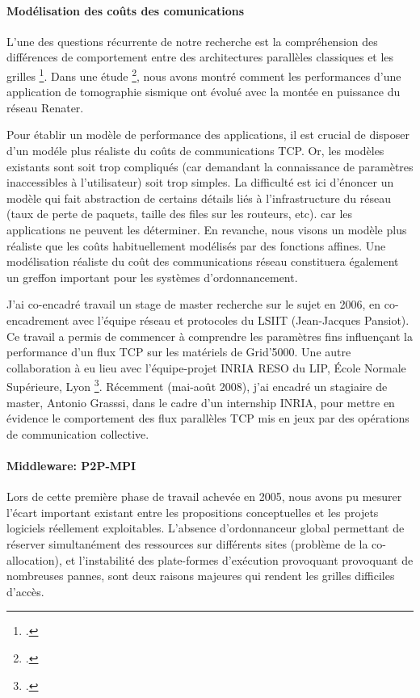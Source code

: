 \documentclass[11pt]{article}
\newcommand{\pmpi}{\mbox{\textsc{P2P-MPI}}}
\begin{document}
\paragraph{Modélisation des coûts des comunications}
\label{sc:modele-cout}
L'une des questions récurrente de notre recherche est la compréhension 
des différences de comportement entre des architectures parallèles classiques et les grilles 
\footcite{icps-2002-20,icps-2004-107}. Dans une étude \footcite{icps-2005-146}, nous avons montré comment les 
performances d'une application de tomographie sismique ont évolué avec la montée en puissance du réseau Renater.

Pour établir un modèle de performance des applications, il est crucial de disposer
d'un modéle plus réaliste du coûts de communications TCP. Or, les modèles existants
sont soit trop compliqués (car demandant la connaissance de paramètres inaccessibles
à l'utilisateur) soit trop simples.  
La difficulté est ici d'énoncer un modèle qui fait abstraction de certains détails
liés à l'infrastructure du réseau (taux de perte de paquets, taille des files sur les routeurs, etc). 
car les applications ne peuvent les déterminer.
En revanche, nous visons un modèle plus réaliste que les coûts habituellement modélisés par des fonctions affines.
Une modélisation réaliste du coût des communications réseau constituera également un greffon 
important pour les systèmes d'ordonnancement.

J'ai co-encadré travail un stage de master recherche sur le sujet en 2006, 
en co-encadrement avec l'équipe réseau et protocoles du LSIIT (Jean-Jacques Pansiot).
Ce travail a permis de commencer à comprendre les paramètres fins influençant 
la performance d'un flux TCP sur les matériels de Grid'5000. Une autre 
collaboration à eu lieu avec l'équipe-projet INRIA RESO
du LIP, \'{E}cole Normale Supérieure, Lyon \footcite{DBLP:conf/cluster/HablotGMGP07}. 
Récemment (mai-août 2008), j'ai encadré un stagiaire 
de master, Antonio Grasssi, dans le cadre d'un internship INRIA, pour mettre en évidence le comportement
des flux parallèles TCP mis en jeux par des opérations de communication collective.


\paragraph{Middleware: \pmpi}
Lors de cette première phase de travail achevée en 2005, nous avons pu mesurer l'écart important 
existant entre les propositions conceptuelles et les projets logiciels réellement exploitables.
L'absence d'ordonnanceur global permettant de réserver simultanément 
des ressources sur  différents sites (problème de la co-allocation), et l'instabilité des plate-formes
d'exécution provoquant provoquant de nombreuses pannes, sont deux raisons majeures qui rendent
les grilles difficiles d'accès.
 
\end{document}
